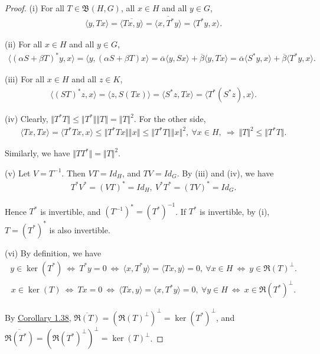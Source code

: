 \documentclass{article}
\begin{document}
\begin{proof}
(i) For all $T\in\mathfrak{B}(H,G)$, all $x\in H$ and all $y\in G$,
\begin{align*}
	\langle y,Tx\rangle = \overline{\langle Tx,y\rangle} = \overline{\langle x,T^*y\rangle} = \langle T^*y,x\rangle.
\end{align*}

(ii) For all $x\in H$ and all $y\in G$,
\begin{align*}	
	\langle(\alpha S+\beta T)^*y, x\rangle = \langle y, (\alpha S+\beta T)x\rangle = \overline{\alpha}\langle y,Sx\rangle + \overline{\beta}\langle y,Tx\rangle = \overline{\alpha}\langle S^*y,x\rangle + \overline{\beta}\langle T^*y,x\rangle.
\end{align*}

(iii) For all $x\in H$ and all $z\in K$,
\begin{align*}
	\langle (ST)^*z,x\rangle = \langle z, S(Tx)\rangle = \langle S^*z, Tx\rangle = \langle T^*(S^*z), x\rangle.
\end{align*}
	
(iv) Clearly, $\Vert T^*T\Vert \leq \Vert T^*\Vert\left\Vert T\right\Vert = \Vert T\Vert^2$. For the other side,
\begin{align*}
	\langle Tx,Tx\rangle = \langle T^*Tx, x\rangle \leq \Vert T^*Tx\Vert\left\Vert x\right\Vert \leq \Vert T^*T\Vert\left\Vert x\right\Vert^2,\ \forall x\in H,\ \Rightarrow\ \Vert T\Vert^2 \leq \Vert T^*T\Vert.
\end{align*}

Similarly, we have $\Vert TT^*\Vert = \Vert T\Vert^2$.\vspace{0.1cm}
	
(v) Let $V=T^{-1}$. Then $VT=Id_H$, and $TV=Id_G$. By (iii) and (iv), we have
\begin{align*}
	T^*V^* = (VT)^* = Id_{H},\ V^*T^* = (TV)^* = Id_{G}.
\end{align*}

Hence $T^*$ is invertible, and $(T^{-1})^*=(T^*)^{-1}$. If $T^*$ is invertible, by (i), $T=(T^*)^*$ is also invertible.
	
(vi) By definition, we have
\begin{align*}
	y\in\ker(T^*)\ \Leftrightarrow\ T^*y = 0\ \Leftrightarrow\ \langle x,T^*y\rangle = \langle Tx,y\rangle = 0,\ \forall x\in H\ \Leftrightarrow\ y\in\mathfrak{R}(T)^\perp.
\end{align*}
\begin{align*}
	x\in\ker(T)\ \Leftrightarrow\ Tx = 0\ \Leftrightarrow\ \langle Tx,y\rangle = \langle x,T^*y\rangle = 0,\ \forall y\in H\ \Leftrightarrow\ x\in\mathfrak{R}(T^*)^\perp.
\end{align*}

By \hyperref[cor:1.38]{Corollary 1.38}, $\overline{\mathfrak{R}(T)}=(\mathfrak{R}(T)^\perp)^\perp = \ker(T^*)^\perp$, and $\overline{\mathfrak{R}(T^*)}=(\mathfrak{R}(T^*)^\perp)^\perp = \ker(T)^\perp$.
\end{proof}
\end{document}
